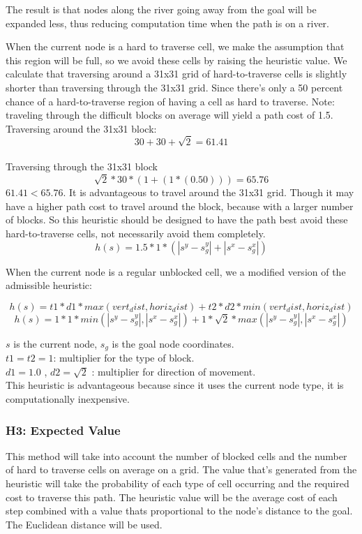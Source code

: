 The result is that nodes along the river going away from the goal will be expanded less, thus reducing computation time when the path is on a river.

When the current node is a hard to traverse cell, we make the assumption that this region will be full, so we avoid these cells by raising the heuristic value.
We calculate that traversing around a 31x31 grid of hard-to-traverse cells is slightly shorter than traversing through the 31x31 grid. Since there's only a 50 percent chance of a hard-to-traverse region of having a cell as hard to traverse. Note: traveling through the difficult blocks on average will yield a path cost of 1.5.
\\Traversing around the 31x31 block: \[ 30 + 30 + \sqrt{2} = 61.41 \]
\\Traversing through the 31x31 block \[ \sqrt{2} * 30 * (1 + (1 * (0.50))) = 65.76\] 
$61.41 < 65.76$. It is advantageous to travel around the 31x31 grid.
Though it may have a higher path cost to travel around the block, because with a larger number of blocks.
So this heuristic should be designed to have the path best avoid these hard-to-traverse cells, not necessarily avoid them completely.
\[h(s) = 1.5 * 1 * ( |s^y - s_g^y| + |s^x - s_g^x| )\]

When the current node is a regular unblocked cell, we a modified version of the admissible heuristic:

\[h(s) = t1 * d1  * max(vert_dist, horiz_dist) + t2 * d2 * min(vert_dist, horiz_dist)\]
\[h(s) = 1 * 1 *min(|s^y - s_g^y|, |s^x - s_g^x|) + 1 * \sqrt{2} * max(|s^y - s_g^y|, |s^x - s_g^x|)   \]

 $s$ is the current node, $s_g$ is the goal node coordinates. \\
 $t1 = t2 = 1$: multiplier for the type of block. \\
 $d1 = 1.0$ , $d2 = \sqrt{2}$ : multiplier for direction of movement. \\

This heuristic is advantageous because since it uses the current node type, it is computationally inexpensive.

\subsubsection{H3: Expected Value}
This method will take into account the number of blocked cells and the number of hard to traverse cells on average on a grid. The value that's generated from the heuristic will take the probability of each type of cell occurring and the required cost to traverse this path. The heuristic value will be the average cost of each step combined with a value thats proportional to the node's distance to the goal. The Euclidean distance will be used.

